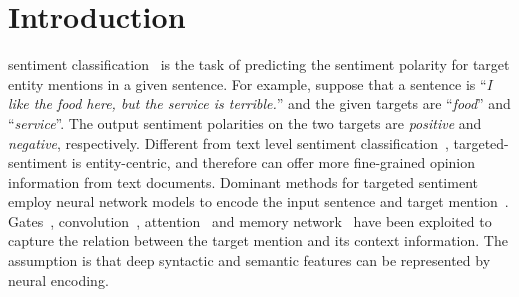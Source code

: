 \documentclass[journal]{IEEEtran}
\begin{document}
	\section{Introduction}
 sentiment classification~\cite{jiang-etal-2011-target,dong-etal-2014-adaptive,Vo2015TargetDependentTS,Zhang2016GatedNN,wang-etal-2018-target} is the task of predicting the sentiment polarity for target entity mentions in a given sentence. 
	For example, suppose that a sentence is ``\textit{I like
		the food here, but the service is terrible.}'' and the given targets are ``\textit{food}'' and ``\textit{service}''. 
	The output sentiment polarities on the two targets are \textit{positive} and \textit{negative}, respectively. 
	Different from text level sentiment classification~\cite{pang-etal-2002-thumbs,Meena07,yessenalina-etal-2010-multi}, targeted-sentiment is entity-centric, and therefore can offer more fine-grained opinion information from text documents.
	Dominant methods for targeted sentiment employ neural network models to encode the input sentence and target mention~\cite{wang-etal-2016-attention,Wang2018TargetSensitiveMN}. 
	Gates~\cite{Vo2015TargetDependentTS,tang-etal-2016-effective,Zhang2016GatedNN}, convolution~\cite{li-etal-2018-transformation,huang-carley-2018-parameterized}, attention~\cite{Ma2017InteractiveAN,tang-etal-2019-progressive} and memory network~\cite{Tang2016AspectLS,Chen2017RecurrentAN,Wang2018TargetSensitiveMN} have been exploited to capture the relation between the target mention and its context information. 
	The assumption is that deep syntactic and semantic features can be represented by neural encoding. 
	
\end{document}

